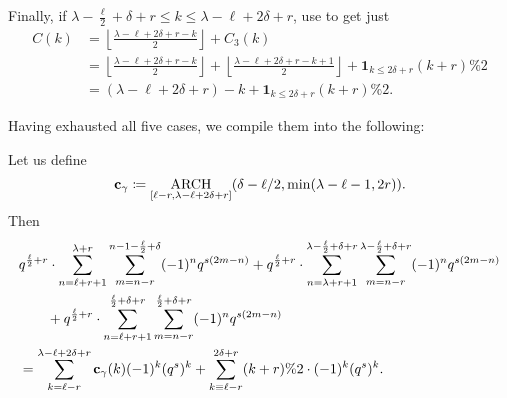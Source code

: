 \begin{enumerate}
  \ii Finally, if $\lambda - \frac{\ell}{2} + \delta + r \le k \le \lambda - \ell + 2 \delta + r$,
  use  to get just
  \begin{align*}
    C(k) &= \left\lfloor \frac{\lambda - \ell + 2\delta + r - k}{2} \right\rfloor + C_3(k) \\
    &= \left\lfloor \frac{\lambda - \ell + 2\delta + r - k}{2} \right\rfloor +
      \left\lfloor \frac{\lambda - \ell + 2\delta + r - k + 1}{2} \right\rfloor
      + \mathbf{1}_{k \le 2 \delta + r} (k + r) \% 2 \\
    &= (\lambda - \ell + 2 \delta + r) - k + \mathbf{1}_{k \le 2 \delta + r} (k + r) \% 2.
  \end{align*}
\end{enumerate}
Having exhausted all five cases, we compile them into the following:
\begin{proposition}
  [$\cc_\gamma$]
  \label{prop:ell_even_top_coeff}
  Let us define
  \[
    \mathbf c_\gamma \coloneqq \operatorname*{ARCH}_{[\ell-r, \lambda - \ell + 2\delta + r]}
    (\delta - \ell/2, \min(\lambda-\ell-1, 2r)).
  \]
  Then
  \begin{align*}
  & q^{\frac{\ell}{2}+r} \cdot \sum_{n=\ell+r+1}^{\lambda+r}
    \sum_{m=n-r}^{n-1-\frac{\ell}{2}+\delta}
    (-1)^n q^{s(2m-n)}
  + q^{\frac{\ell}{2}+r} \cdot \sum_{n=\lambda+r+1}^{\lambda-\frac{\ell}{2}+\delta+r}
    \sum_{m=n-r}^{\lambda-\frac{\ell}{2}+\delta+r}
    (-1)^n q^{s(2m-n)} \\
  &\qquad+ q^{\frac{\ell}{2}+r} \cdot \sum_{n=\ell+r+1}^{\frac{\ell}{2}+\delta+r}
    \sum_{m=n-r}^{\frac{\ell}{2}+\delta+r}
    (-1)^n q^{s(2m-n)} \\
  &= \sum_{k=\ell-r}^{\lambda-\ell+2\delta+r} \mathbf c_\gamma(k) (-1)^k (q^s)^k
    + \sum_{k \equiv \ell-r}^{2\delta+r} (k+r)\%2 \cdot (-1)^k (q^s)^k.
  \end{align*}
\end{proposition}

